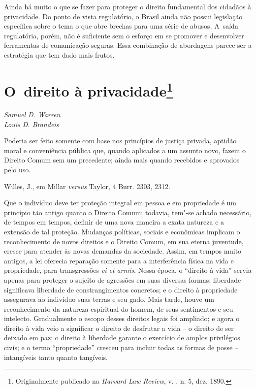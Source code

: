 Ainda há muito o que se fazer para proteger o direito fundamental dos
cidadãos à privacidade. Do ponto de vista regulatório, o Brasil ainda
não possui legislação específica sobre o tema o que abre brechas para
uma série de abusos. A~saída regulatória, porém, não é suficiente sem o
esforço em se promover e desenvolver ferramentas de comunicação seguras.
Essa combinação de abordagens parece ser a estratégia que tem dado mais
frutos.

\chapter{O~direito à privacidade\footnote{Originalmente publicado na \emph{Harvard
  Law Review}, v. , n. 5, dez. 1890.}}\label{o-direito-uxe0-privacidade}

\begin{flushright}
\emph{Samuel D. Warren\\
Louis D. Brandeis}
\end{flushright}

\epigraph{Poderia ser feito somente com base nos princípios de justiça privada,
aptidão moral e conveniência pública que, quando aplicados a um assunto
novo, fazem o Direito Comum sem um precedente; ainda mais quando
recebidos e aprovados pelo uso.}{Willes, J., em Millar \emph{versus} Taylor, 4 Burr. 2303, 2312.}

Que o indivíduo deve ter proteção integral em pessoa e em propriedade é
um princípio tão antigo quanto o Direito Comum; todavia, tem"-se achado
necessário, de tempos em tempos, definir de uma nova maneira a exata
natureza e a extensão de tal proteção. Mudanças políticas, sociais e
econômicas implicam o reconhecimento de novos direitos e o Direito
Comum, em sua eterna juventude, cresce para atender às novas demandas da
sociedade. Assim, em tempos muito antigos, a lei oferecia reparação
somente para a interferência física na vida e propriedade, para
transgressões \emph{vi et armis}. Nessa época, o ``direito à vida''
servia apenas para proteger o sujeito de agressões em suas diversas
formas; liberdade significava liberdade de constrangimentos concretos; e
o direito à propriedade assegurava ao indivíduo suas terras e seu gado.
Mais tarde, houve um reconhecimento da natureza espiritual do homem, de
seus sentimentos e seu intelecto. Gradualmente o escopo desses direitos
legais foi ampliado; e agora o direito à vida veio a significar o
direito de desfrutar a vida -- o direito de ser deixado em paz; o
direito à liberdade garante o exercício de amplos privilégios civis; e o
termo ``propriedade'' cresceu para incluir todas as formas de posse --
intangíveis tanto quanto tangíveis.

